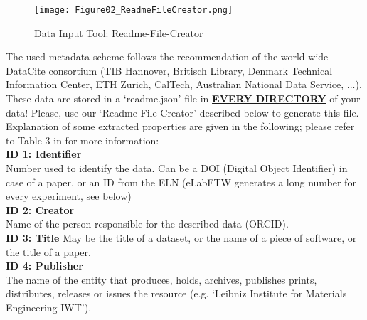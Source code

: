 \begin{wrapfigure}{r}{0.5\linewidth}
  \vspace{-1em}
  \texttt{[image: Figure02\_ReadmeFileCreator.png]}
  \caption{Data Input Tool: Readme-File-Creator}
  \label{fig:readme-creator}
\end{wrapfigure}
The used metadata scheme follows the recommendation of the world wide DataCite
consortium (TIB Hannover, Britisch Library, Denmark Technical Information
Center, ETH Zurich, CalTech, Australian National Data Service, ...). These data
are stored in a `readme.json' file in \textbf{\underline{EVERY DIRECTORY}} of
your data! Please, use our `Readme File Creator' described below to generate
this file.\\
Explanation of some extracted properties are given in the following; please
refer to Table 3 in \cite{datacite2019} for more information: \\[6pt]
%
\textbf{ID 1: Identifier} \\
Number used to identify the data. Can be a DOI (Digital Object Identifier) in
case of a paper, or an ID from the ELN (eLabFTW generates a long number for
every experiment, see below) \\[6pt]
%
\textbf{ID 2: Creator} \\
Name of the person responsible for the described data (ORCID). \\[6pt]
%
\textbf{ID 3: Title}
May be the title of a dataset, or the name of a piece of software, or the
title of a paper. \\[6pt]
%
\textbf{ID 4: Publisher} \\
The name of the entity that produces, holds, archives, publishes prints,
distributes, releases or issues the resource (e.g. `Leibniz Institute for
Materials Engineering IWT'). \\[6pt]

